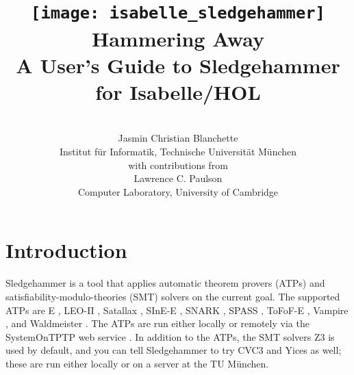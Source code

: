 \documentclass[a4paper,12pt]{article}
\begin{document}

\title{\texttt{[image: isabelle\_sledgehammer]} \\[4ex]
Hammering Away \\[\smallskipamount]
\Large A User's Guide to Sledgehammer for Isabelle/HOL}
\author{\hbox{} \\
Jasmin Christian Blanchette \\
{\normalsize Institut f\"ur Informatik, Technische Universit\"at M\"unchen} \\[4\smallskipamount]
{\normalsize with contributions from} \\[4\smallskipamount]
Lawrence C. Paulson \\
{\normalsize Computer Laboratory, University of Cambridge} \\
\hbox{}}

\maketitle

\tableofcontents

\setlength{\parskip}{.7em plus .2em minus .1em}
\setlength{\parindent}{0pt}
\setlength{\abovedisplayskip}{\parskip}
\setlength{\abovedisplayshortskip}{.9\parskip}
\setlength{\belowdisplayskip}{\parskip}
\setlength{\belowdisplayshortskip}{.9\parskip}

\newenvironment{enum}%
    {\begin{list}{}{%
        \setlength{\topsep}{.1\parskip}%
        \setlength{\partopsep}{.1\parskip}%
        \setlength{\itemsep}{\parskip}%
        \advance\itemsep by-\parsep}}
    {\end{list}}

\def\pre{\begingroup\vskip0pt plus1ex\advance\leftskip by\leftmargin
\advance\rightskip by\leftmargin}
\def\post{\vskip0pt plus1ex\endgroup}

\def\prew{\pre\advance\rightskip by-\leftmargin}
\def\postw{\post}

\section{Introduction}
\label{introduction}

Sledgehammer is a tool that applies automatic theorem provers (ATPs)
and satisfiability-modulo-theories (SMT) solvers on the current goal. The
supported ATPs are E \cite{schulz-2002}, LEO-II \cite{leo2}, Satallax
\cite{satallax}, SInE-E \cite{sine}, SNARK \cite{snark}, SPASS
\cite{weidenbach-et-al-2009}, ToFoF-E \cite{tofof}, Vampire
\cite{riazanov-voronkov-2002}, and Waldmeister \cite{waldmeister}. The ATPs are
run either locally or remotely via the System\-On\-TPTP web service
\cite{sutcliffe-2000}. In addition to the ATPs, the SMT solvers Z3 \cite{z3} is
used by default, and you can tell Sledgehammer to try CVC3 \cite{cvc3} and Yices
\cite{yices} as well; these are run either locally or on a server at the TU
M\"unchen.
\end{document}
